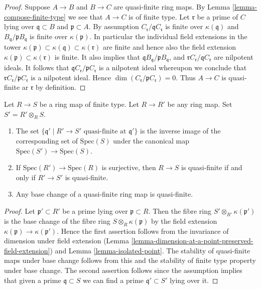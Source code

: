 \begin{proof}
Suppose $A \to B$ and $B \to C$ are quasi-finite ring maps.
By Lemma \ref{lemma-compose-finite-type}
we see that $A \to C$ is of finite type.
Let $\mathfrak r$ be a prime of $C$ lying over $\mathfrak q \subset B$
and $\mathfrak p \subset A$. By assumption
$C_{\mathfrak r}/\mathfrak qC_{\mathfrak r}$ is finite over
$\kappa(\mathfrak q)$ and
$B_{\mathfrak q}/\mathfrak pB_{\mathfrak q}$ is finite over
$\kappa(\mathfrak p)$. In particular the individual field extensions
in the tower
$\kappa(\mathfrak p) \subset \kappa(\mathfrak q) \subset \kappa(\mathfrak r)$
are finite and hence also the field extension
$\kappa(\mathfrak p) \subset \kappa(\mathfrak r)$ is finite.
It also implies that
$\mathfrak qB_{\mathfrak q}/\mathfrak pB_{\mathfrak q}$, and
$\mathfrak rC_{\mathfrak r}/\mathfrak qC_{\mathfrak r}$
are nilpotent ideals. It follows that
$\mathfrak qC_{\mathfrak r}/\mathfrak pC_{\mathfrak r}$
is a nilpotent ideal whereupon we conclude that
$\mathfrak rC_{\mathfrak r}/\mathfrak pC_{\mathfrak r}$
is a nilpotent ideal. Hence
$\dim(C_{\mathfrak r}/\mathfrak pC_{\mathfrak r}) = 0$.
Thus $A \to C$ is quasi-finite ar $\mathfrak r$ by definition.
\end{proof}

\begin{lemma}
\label{lemma-quasi-finite-base-change}
Let $R \to S$ be a ring map of finite type.
Let $R \to R'$ be any ring map. Set $S' = R' \otimes_R S$.
\begin{enumerate}
\item The set
$\{\mathfrak q' \mid R' \to S' \text{ quasi-finite at }\mathfrak q'\}$
is the inverse image of the corresponding set of $\text{Spec}(S)$
under the canonical map $\text{Spec}(S') \to \text{Spec}(S)$.
\item If $\text{Spec}(R') \to \text{Spec}(R)$ is surjective,
then $R \to S$ is quasi-finite if and only if $R' \to S'$ is quasi-finite.
\item Any base change of a quasi-finite ring map is quasi-finite.
\end{enumerate}
\end{lemma}

\begin{proof}
Let $\mathfrak p' \subset R'$ be a prime lying over $\mathfrak p \subset R$.
Then the fibre ring $S' \otimes_{R'} \kappa(\mathfrak p')$ is the
base change of the fibre ring $S \otimes_R \kappa(\mathfrak p)$
by the field extension $\kappa(\mathfrak p) \to \kappa(\mathfrak p')$.
Hence the first assertion follows from the invariance of dimension
under field extension
(Lemma \ref{lemma-dimension-at-a-point-preserved-field-extension})
and Lemma \ref{lemma-isolated-point}.
The stability of quasi-finite maps under base change follows from
this and the stability of finite type property under base change.
The second assertion follows
since the assumption implies that given a prime $\mathfrak q \subset S$ we can
find a prime $\mathfrak q' \subset S'$ lying over it.
\end{proof}

